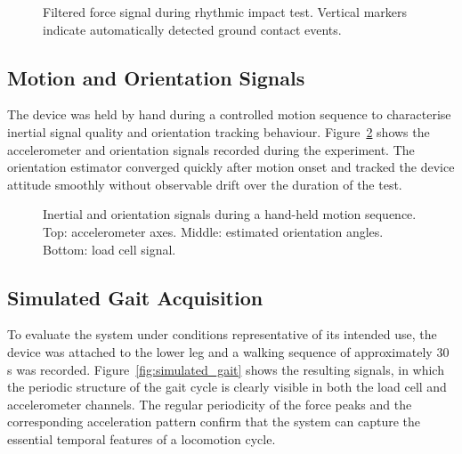 \begin{figure}[h]
  \centering
  \caption{Filtered force signal during rhythmic impact test.
           Vertical markers indicate automatically detected ground contact events.}
  \label{fig:impact_detection}
\end{figure}

\subsection{Motion and Orientation Signals}

The device was held by hand during a controlled motion sequence to
characterise inertial signal quality and orientation tracking behaviour.
Figure~\ref{fig:imu_motion} shows the accelerometer and orientation
signals recorded during the experiment.
The orientation estimator converged quickly after motion onset and
tracked the device attitude smoothly without observable drift over the
duration of the test.

\begin{figure}[h]
  \centering
  \caption{Inertial and orientation signals during a hand-held motion
           sequence. Top: accelerometer axes. Middle: estimated orientation
           angles. Bottom: load cell signal.}
  \label{fig:imu_motion}
\end{figure}

\subsection{Simulated Gait Acquisition}

To evaluate the system under conditions representative of its intended use,
the device was attached to the lower leg and a walking sequence of
approximately 30\,s was recorded.
Figure~\ref{fig:simulated_gait} shows the resulting signals, in which the
periodic structure of the gait cycle is clearly visible in both the load
cell and accelerometer channels.
The regular periodicity of the force peaks and the corresponding
acceleration pattern confirm that the system can capture the essential
temporal features of a locomotion cycle.

